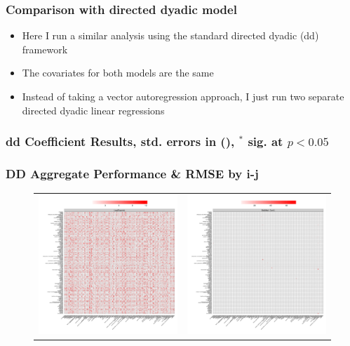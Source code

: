\documentclass[10pt, compress]{beamer}
\begin{document}
\frame
{
  \frametitle{Comparison with directed dyadic model}
  \begin{itemize}
  \item Here I run a similar analysis using the standard directed dyadic (dd) framework
  \item The covariates for both models are the same 
  \item Instead of taking a vector autoregression approach, I just run two separate directed dyadic linear regressions
  \end{itemize}
} 

\frame
{
  \frametitle{dd Coefficient Results, std. errors in (), $^*$ sig. at $p< 0.05 $ }
  \vspace{-.3in}
  \tiny{}
}

\frame
{
\frametitle{DD Aggregate Performance \& RMSE by i-j}
  
  \vspace*{-.3in}
  \begin{figure}[ht]
  \centering
    \begin{tabular}{cc}
      \includegraphics[width=.45\textwidth]{dyadexpiperf.pdf} & 
      \includegraphics[width=.45\textwidth]{dyadmconfiperf.pdf}
    \end{tabular}
  \end{figure}
}

\end{document}

